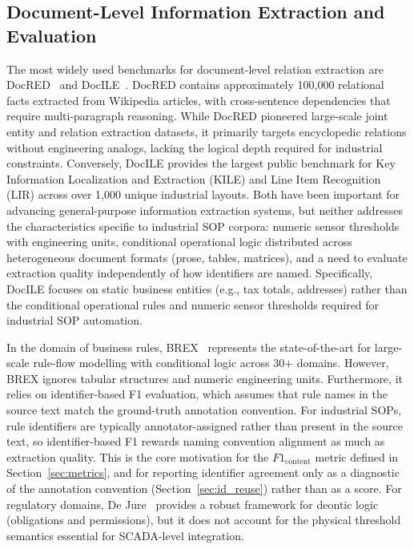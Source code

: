 \documentclass[11pt]{article}
\begin{document}
\subsection{Document-Level Information Extraction and Evaluation}
\label{sec:rw_benchmarks}

The most widely used benchmarks for document-level relation extraction are
DocRED~\cite{yao2019docred} and DocILE~\cite{simsa2023docile}.
DocRED contains approximately 100,000 relational facts extracted from Wikipedia
articles, with cross-sentence dependencies that require multi-paragraph reasoning.
While DocRED pioneered large-scale joint entity and relation extraction datasets, it primarily targets encyclopedic relations without engineering analogs, lacking the logical depth required for industrial constraints.
Conversely, DocILE provides the largest public benchmark for Key Information Localization and Extraction (KILE) and Line Item Recognition (LIR) across over 1,000 unique industrial layouts.
Both have been important for advancing general-purpose information extraction
systems, but neither addresses the characteristics specific to industrial SOP
corpora: numeric sensor thresholds with engineering units, conditional operational
logic distributed across heterogeneous document formats (prose, tables, matrices),
and a need to evaluate extraction quality independently of how identifiers are
named.
Specifically, DocILE focuses on static business entities (e.g., tax totals, addresses) rather than the conditional operational rules and numeric sensor thresholds required for industrial SOP automation.

In the domain of business rules, BREX~\cite{yang2025brex} represents the state-of-the-art for large-scale rule-flow modelling with conditional logic across 30+ domains.
However, BREX ignores tabular structures and numeric engineering units.
Furthermore, it relies on identifier-based F1 evaluation, which assumes that rule
names in the source text match the ground-truth annotation convention.
For industrial SOPs, rule identifiers are typically annotator-assigned rather
than present in the source text, so identifier-based F1 rewards naming convention
alignment as much as extraction quality.
This is the core motivation for the $F1_{\text{content}}$ metric defined in
Section~\ref{sec:metrics}, and for reporting identifier agreement only as a
diagnostic of the annotation convention (Section~\ref{sec:id_reuse}) rather than
as a score.
For regulatory domains, De Jure~\cite{guliani2026dejure} provides a robust framework for deontic logic (obligations and permissions), but it does not account for the physical threshold semantics essential for SCADA-level integration.
\end{document}
